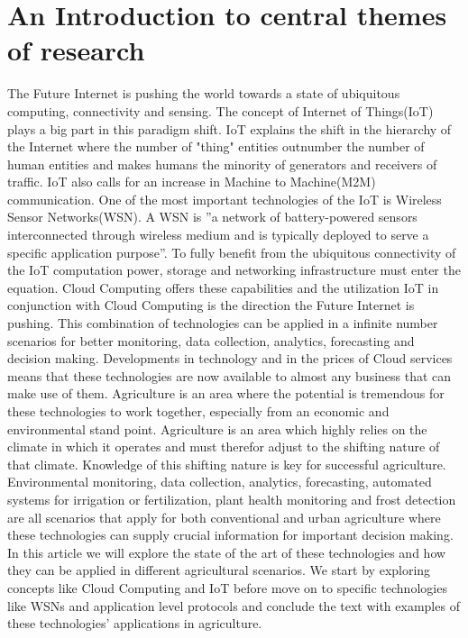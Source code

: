 \documentclass[]{uiophd}
\begin{document}
\section{An Introduction to central themes of research}
The Future Internet is pushing the world towards a state of ubiquitous computing, connectivity and sensing. The concept of Internet of Things(IoT) plays a big part in this paradigm shift. IoT explains the shift in the hierarchy of the Internet where the number of "thing" entities outnumber the number of human entities and makes humans the minority of generators and receivers of traffic. IoT also calls for an increase in Machine to Machine(M2M) communication. One of the most important technologies of the IoT is Wireless Sensor Networks(WSN). A WSN is ''a network of battery-powered sensors interconnected through wireless medium and is typically deployed to serve a specific application purpose''\cite{Ojha2015662}. To fully benefit from the ubiquitous connectivity of the IoT computation power, storage and networking infrastructure must enter the equation. Cloud Computing offers these capabilities and the utilization IoT in conjunction with Cloud Computing is the direction the Future Internet is pushing. This combination of technologies can be applied in a infinite number scenarios for better monitoring, data collection, analytics, forecasting and decision making. Developments in technology and in the prices of Cloud services means that these technologies are now available to almost any business that can make use of them. Agriculture is an area where the potential is tremendous for these technologies to work together, especially from an economic and environmental stand point. Agriculture is an area which highly relies on the climate in which it operates and must therefor adjust to the shifting nature of that climate. Knowledge of this shifting nature is key for successful agriculture. Environmental monitoring, data collection, analytics, forecasting, automated systems for irrigation or fertilization, plant health monitoring and frost detection are all scenarios that apply for both conventional and urban agriculture where these technologies can supply crucial information for important decision making. In this article we will explore the state of the art of these technologies and how they can be applied in different agricultural scenarios. We start by exploring concepts like Cloud Computing and IoT before move on to specific technologies like WSNs and application level protocols and conclude the text with examples of these technologies' applications in agriculture.
\end{document}
